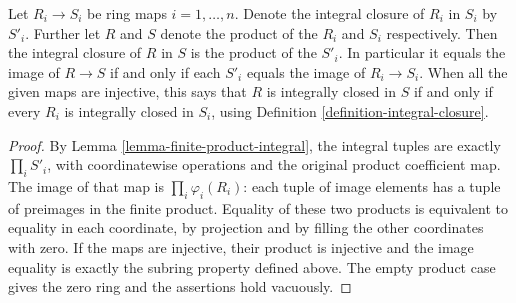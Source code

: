 \begin{lemma}
\label{lemma-finite-product-integral-closure}
Let $R_i\to S_i$ be ring maps $i = 1, \ldots, n$.
Denote the integral closure of $R_i$ in $S_i$ by $S'_i$.
Further let $R$ and $S$ denote the product of the $R_i$ and $S_i$ respectively.
Then the integral closure of $R$ in $S$
is the product of the $S'_i$. In particular it equals the image
of $R\to S$ if and only if each $S'_i$ equals the image of
$R_i\to S_i$. When all the given maps are injective, this says
that $R$ is integrally closed in $S$ if and only if every $R_i$
is integrally closed in $S_i$, using Definition \ref{definition-integral-closure}.
\end{lemma}

\begin{proof}
By Lemma \ref{lemma-finite-product-integral}, the integral tuples
are exactly $\prod_iS'_i$, with coordinatewise operations and the
original product coefficient map. The image of that map is
$\prod_i\varphi_i(R_i)$: each tuple of image elements has a tuple
of preimages in the finite product. Equality of these two products
is equivalent to equality in each coordinate, by projection and
by filling the other coordinates with zero. If the maps are
injective, their product is injective and the image equality is
exactly the subring property defined above. The empty product
case gives the zero ring and the assertions hold vacuously.
\end{proof}